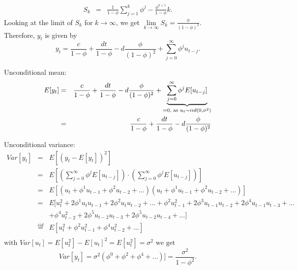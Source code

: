 \documentclass[a4paper]{scrartcl}
\begin{document}
\begin{enumerate}
\begin{solution}
\begin{eqnarray*}
                      S_{k}	&=& \frac{1}{1 - \phi} \sum_{j = 1}^{k} \phi^j - \frac{\phi^{k+1}}{1 - \phi} k.
                  \end{eqnarray*}
                  Looking at the limit of $S_{k}$ for $k \to \infty$, we get
                  $\lim\limits_{k \to \infty} S_{k} = \frac{\phi}{(1 - \phi)^2}$. \\
                  Therefore, $y_{t}$ is given by
                  \begin{displaymath}
                      y_{t} = \frac{c}{1-\phi} + \frac{dt}{1-\phi} - d \frac{\phi}{(1 - \phi)^2}  + \sum_{j=0}^{\infty} \phi^j u_{t-j}.
                  \end{displaymath}
                  
                  Unconditional mean:
                  \begin{eqnarray*}
                      E[y_{t}] &=& \frac{c}{1-\phi} + \frac{dt}{1-\phi} - d \frac{\phi}{(1 - \phi)^2}  + \underbrace{\sum_{j=0}^{\infty} \phi^j E[u_{t-j}]}_{=0 \text{, as } \space  u_{t} \sim iid(0, \sigma^2)} \\
                      &=& \frac{c}{1-\phi} + \frac{dt}{1-\phi} - d \frac{\phi}{(1 - \phi)^2}
                  \end{eqnarray*}
                  
                  Unconditional variance:
                  \begin{eqnarray*}
                      Var[y_{t}] 
                      &=& E[(y_{t} - E[y_{t}])^2 ] \\
                      &=& E[(\sum_{j=0}^{\infty} \phi^j E[u_{t-j}]) \cdot (\sum_{j=0}^{\infty} \phi^j E[u_{t-j}])] \\
                      &=& E[(u_{t} + \phi^1 u_{t-1} + \phi^2 u_{t-2} + \dots)(u_{t} + \phi^1 u_{t-1} + \phi^2 u_{t-2} + \dots)] \\
                      &=& E[	u_{t}^2 + 2\phi^1 u_{t}u_{t-1} + 2\phi^2 u_{t}u_{t-2} + \dots + 
                      \phi^2 u_{t-1}^2 + 2\phi^3 u_{t-1}u_{t-2} + 2\phi^4 u_{t-1}u_{t-3} + \dots  \\
                      &&+ \phi^4 u_{t-2}^2 + 2\phi^5 u_{t-2}u_{t-3} + 2\phi^5 u_{t-2}u_{t-4} + \dots ] \\
                      &\overset{iid}{=}& E [ u_{t}^2+ \phi^2 u_{t-1}^2 + \phi^4 u_{t-2}^2 + \dots ] \\
                  \end{eqnarray*}
                  $\text{with } Var[u_{t}] = E[u_{t}^2] - E[u_{t}]^2 = E[u_{t}^2] = \sigma^2 \text{ we get}$
                  \begin{displaymath}
                      Var[y_{t}] = \sigma^2 ( \phi^0 + \phi^2 + \phi^4 + \dots )] = \frac{\sigma^2}{1-\phi^2}.
                  \end{displaymath}
                  

\end{solution}
\end{enumerate}
\end{document}
